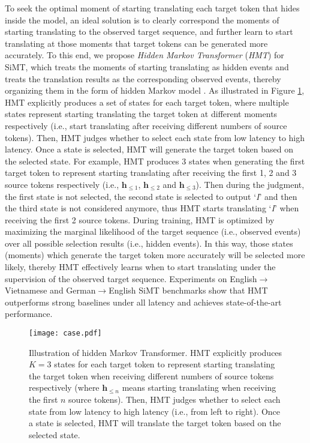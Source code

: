 \documentclass{article} %
\begin{document}
To seek the optimal moment of starting translating each target token that hides inside the model, an ideal solution is to clearly correspond the moments of starting translating to the observed target sequence, and further learn to start translating at those moments that target tokens can be generated more accurately.
To this end, we propose \emph{Hidden Markov Transformer} (\emph{HMT}) for SiMT, which treats the moments of starting translating as hidden events and treats the translation results as the corresponding observed events, thereby organizing them in the form of hidden Markov model \citep{10.2307/2238772,1165342,wang-etal-2018-neural-hidden}.
As illustrated in Figure \ref{fig:case}, HMT explicitly produces a set of states for each target token, where multiple states represent starting translating the target token at different moments respectively (i.e., start translating after receiving different numbers of source tokens). Then, HMT judges whether to select each state from low latency to high latency. Once a state is selected, HMT will generate the target token based on the selected state. 
For example, HMT produces 3 states when generating the first target token to represent starting translating after receiving the first 1, 2 and 3 source tokens respectively (i.e., $\mathbf{h}_{\leq 1}$, $\mathbf{h}_{\leq 2}$ and $\mathbf{h}_{\leq 3}$). Then during the judgment, the first state is not selected, the second state is selected to output `\textit{I}' and then the third state is not considered anymore, thus HMT starts translating `\textit{I}' when receiving the first 2 source tokens.
During training, HMT is optimized by maximizing the marginal likelihood of the target sequence (i.e., observed events) over all possible selection results (i.e., hidden events). In this way, those states (moments) which generate the target token more accurately will be selected more likely, thereby HMT effectively learns when to start translating under the supervision of the observed target sequence.
Experiments on English$\rightarrow$Vietnamese and German$\rightarrow$English SiMT benchmarks show that HMT outperforms strong baselines under all latency and achieves state-of-the-art performance.

\begin{figure}[t]
    \centering
    \texttt{[image: case.pdf]}
    \caption{Illustration of hidden Markov Transformer. HMT explicitly produces $K\!=\!3$ states for each target token to represent starting translating the target token when receiving different numbers of source tokens respectively (where $\mathbf{h}_{\leq n}$ means starting translating when receiving the first $n$ source tokens). Then, HMT judges whether to select each state from low latency to high latency (i.e., from left to right). Once a state is selected, HMT will translate the target token based on the selected state. }
    \label{fig:case}
\end{figure}
\end{document}
